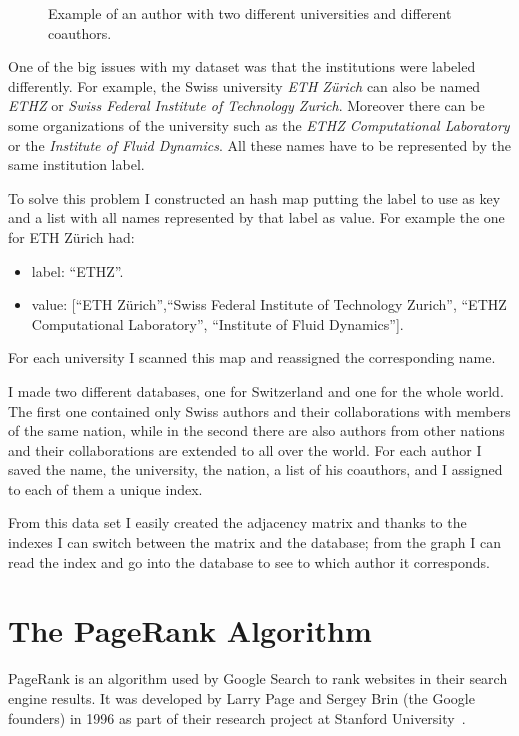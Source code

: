 \documentclass[]{usiinfbachelorproject}
\begin{document}
\begin{figure}
\begin{center}
\begin{tikzpicture}[x=0.75pt,y=0.75pt,yscale=-0.7,xscale=0.7]
\end{tikzpicture}
\caption{Example of an author with two different universities and different coauthors.} \label{fig:twoUni}
\end{center}
\end{figure}

One of the big issues with my dataset was that the institutions were labeled differently. For example, the Swiss university \textit{ETH Z\"{u}rich} can also be named \textit{ETHZ} or \textit{Swiss Federal Institute of Technology Zurich}.  Moreover there can be some organizations of the university such as the \textit{ETHZ Computational Laboratory} or the \textit{Institute of Fluid Dynamics}. All these names have to be represented by the same institution label. 

To solve this problem I constructed an hash map putting the label to use as key and a list with all names represented by that label as value. For example the one for ETH Z\"{u}rich had: 
\begin{itemize}
\item label:  ``ETHZ''.
\item value:  [``ETH Z\"{u}rich'',``Swiss Federal Institute of Technology Zurich'', ``ETHZ Computational Laboratory'', ``Institute of Fluid Dynamics''].
\end{itemize}

For each university I scanned this map and reassigned the corresponding name.

I made two different databases, one for Switzerland and one for the whole world. The first one contained only Swiss authors and their collaborations with members of the same nation, while in the second there are also authors from other nations and their collaborations are extended to all over the world. For each author I saved the name, the university, the nation, a list of his coauthors, and I assigned to each of them a unique index. 

From this data set I easily created the adjacency matrix and thanks to the indexes I can switch between the matrix and the database; from the graph I can read the index and go into the database to see to which author it corresponds.





\section{The PageRank Algorithm} \label{sec:pagerank} 
PageRank is an algorithm used by Google Search to rank websites in their search engine results. It was developed by  Larry Page and  Sergey Brin (the Google founders) in 1996 as part of their research project at Stanford University~\cite{pagerank}.
\end{document}
